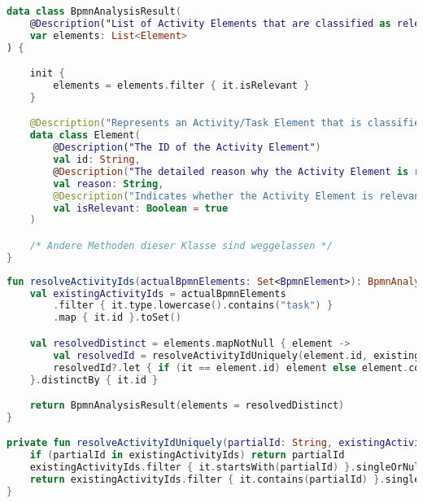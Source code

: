 \begin{lstlisting}[language=Kotlin,caption={Antworttyp fuer die Klassifizierung},label={lst:bpmn-analysis-result}]
data class BpmnAnalysisResult(
    @Description("List of Activity Elements that are classified as relevant for GDPR compliance")
    var elements: List<Element>
) {

    init {
        elements = elements.filter { it.isRelevant }
    }

    @Description("Represents an Activity/Task Element that is classified as relevant for GDPR compliance")
    data class Element(
        @Description("The ID of the Activity Element")
        val id: String,
        @Description("The detailed reason why the Activity Element is relevant for GDPR compliance and why you think personal data is processed.")
        val reason: String,
        @Description("Indicates whether the Activity Element is relevant for GDPR compliance")
        val isRelevant: Boolean = true
    )

    /* Andere Methoden dieser Klasse sind weggelassen */
}
\end{lstlisting}

\begin{lstlisting}[language=Kotlin,caption={Kern der \texttt{id}-Validierung und -Vervollständigung},label={lst:activity-id-resolution}]
fun resolveActivityIds(actualBpmnElements: Set<BpmnElement>): BpmnAnalysisResult {
    val existingActivityIds = actualBpmnElements
        .filter { it.type.lowercase().contains("task") }
        .map { it.id }.toSet()

    val resolvedDistinct = elements.mapNotNull { element ->
        val resolvedId = resolveActivityIdUniquely(element.id, existingActivityIds)
        resolvedId?.let { if (it == element.id) element else element.copy(id = it) }
    }.distinctBy { it.id }

    return BpmnAnalysisResult(elements = resolvedDistinct)
}

private fun resolveActivityIdUniquely(partialId: String, existingActivityIds: Set<String>): String? {
    if (partialId in existingActivityIds) return partialId
    existingActivityIds.filter { it.startsWith(partialId) }.singleOrNull()?.let { return it }
    return existingActivityIds.filter { it.contains(partialId) }.singleOrNull()
}
\end{lstlisting}

